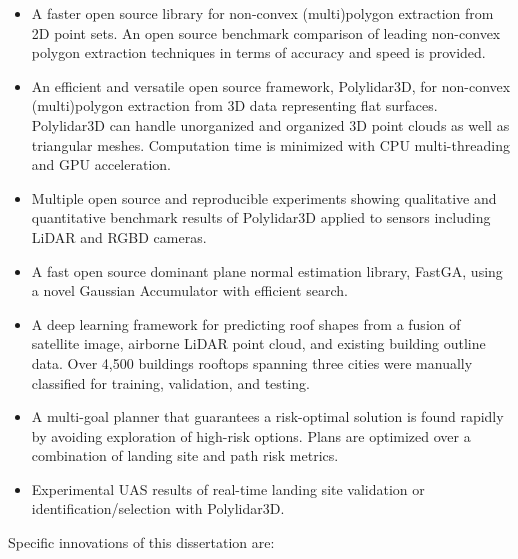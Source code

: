 \begin{itemize}[noitemsep]
  \item A faster open source library for non-convex (multi)polygon extraction from 2D point sets. An open source benchmark comparison of leading non-convex polygon extraction techniques in terms of accuracy and speed is provided. %
  \item An efficient and versatile open source framework, Polylidar3D,  for non-convex (multi)polygon extraction from 3D data representing flat surfaces. Polylidar3D can handle unorganized and organized 3D point clouds as well as triangular meshes. Computation time is minimized with CPU multi-threading and GPU acceleration. %
  \item Multiple open source and reproducible experiments showing qualitative and quantitative benchmark results of Polylidar3D applied to sensors including LiDAR and RGBD cameras.
  \item A fast open source dominant plane normal estimation library, FastGA,  using a novel Gaussian Accumulator with efficient search.
  \item A deep learning framework for predicting roof shapes from a fusion of satellite image, airborne LiDAR point cloud, and existing building outline data. Over 4,500 buildings rooftops spanning three cities were manually classified  for training, validation, and testing.
  \item A multi-goal planner that guarantees a risk-optimal solution is found rapidly by avoiding exploration of high-risk options. Plans are optimized over a combination of landing site and path risk metrics.
  \item Experimental UAS results of real-time landing site validation or identification/selection with Polylidar3D.
\end{itemize}
 
Specific innovations of this dissertation are: %

